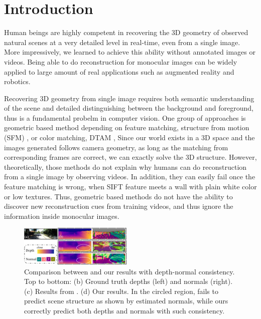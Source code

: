 
\vspace{-1.0\baselineskip}
\section{Introduction}
\label{sec:intro}
\vspace{-0.3\baselineskip}

Human beings are highly competent in recovering the 3D geometry of observed natural scenes at a very detailed level in real-time, even from a single image. 
More impressively, we learned to achieve this ability without annotated images or videos.
Being able to do reconstruction for monocular images can be widely applied to large amount of real applications such as augmented reality and robotics.

Recovering 3D geometry from single image requires both semantic understanding of the scene and detailed distinguishing between the background and foreground, thus is a fundamental probelm in computer vision.
One group of approaches is geometric based method depending on feature matching, \eg structure from motion (SFM) \cite{wu2011visualsfm} \etc, or color matching, \eg DTAM \cite{NewcombeLD11}, \etc  Since our world exists in a 3D space and the images generated follows camera geometry, as long as the matching from corresponding frames are correct, we can exactly solve the 3D structure. 
However, theoretically, those methods do not explain why humans can do reconstruction from a single image by observing videos. 
In addition, they can easily fail once the feature matching is wrong, \eg when SIFT \cite{lowe2004distinctive}  feature meets a wall with plain white color or low textures. 
Thus, geometric based methods do not have the ability to discover new reconstruction cues from training videos, and thus ignore the information inside monocular images.

\begin{figure}
\centering
\includegraphics[width=0.48\textwidth, height=0.18\textwidth]{figures/visual_comparison_comp-v2.pdf}
\caption{Comparison between \protect\cite{zhou2017unsupervised} and our results with depth-normal consistency. Top to bottom: (b) Ground truth depths (left) and normals (right). (c) Results from \protect\cite{zhou2017unsupervised}. (d) Our results. In the circled region, \protect\cite{zhou2017unsupervised} fails to predict scene structure as shown by estimated normals, while ours correctly predict both depths and normals with such consistency.}
\vspace{-1.0\baselineskip}
\label{fig:visual_comparison}
\end{figure}

